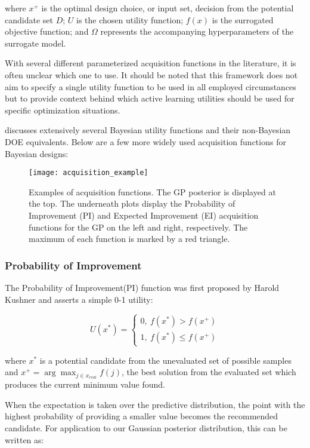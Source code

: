 where $x^+$ is the optimal design choice, or input set, decision from the potential candidate set $D$; $U$ is the chosen utility function; $f(x)$ is the surrogated objective function; and $\Omega$ represents the accompanying hyperparameters of the surrogate model.	

With several different parameterized acquisition functions in the literature, it is often unclear which one to use. It should be noted that this framework does not aim to specify a single utility function to be used in all employed circumstances but to provide context behind which active learning utilities should be used for specific optimization situations. 

\cite{chaloner_bayesian_1995} discusses extensively several Bayesian utility functions and their non-Bayesian DOE equivalents. Below are a few more widely used acquisition functions for Bayesian designs:
\begin{figure}
	\centering
	\texttt{[image: acquisition\_example]}
	\caption{ Examples of acquisition functions. The GP posterior is displayed at the top. The underneath plots display the Probability of Improvement (PI) and Expected Improvement (EI) acquisition functions for the GP on the left and right, respectively. The maximum of each function is marked by a red triangle.}
	\label{fig:AcqEx}
\end{figure}

\subsubsection{Probability of Improvement}
The Probability of Improvement(PI) function was first proposed by Harold Kushner \cite{kushner_new_1964} and asserts a simple 0-1 utility:

\begin{equation}
U(x^\ast) = 
\begin{cases}
0, \ f(x^\ast) > f(x^+) \\
1, \ f(x^\ast) \le f(x^+)
\end{cases}
\end{equation}

where $x^\ast$ is a potential candidate from the unevaluated set of possible samples and $x^+ = \arg \max_{j \in x_{eval}} f(j)$, the best solution from the evaluated set which produces the current minimum value found.

When the expectation is taken over the predictive distribution, the point with the highest probability of providing a smaller value becomes the recommended candidate. For application to our Gaussian posterior distribution, this can be written as:

